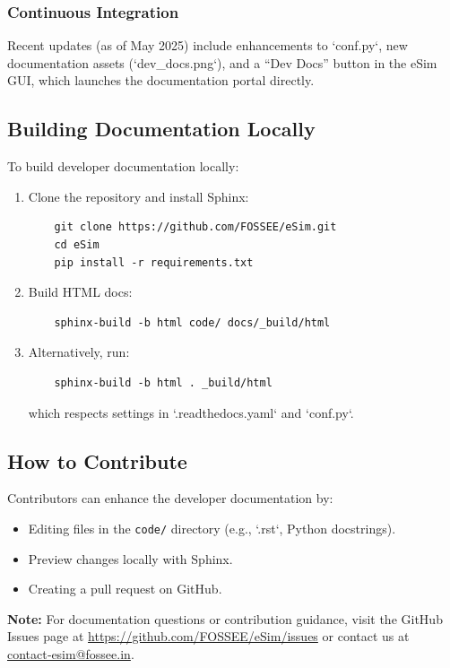 \subsubsection*{Continuous Integration}
Recent updates (as of May 2025) include enhancements to `conf.py`, new documentation assets (`dev\_docs.png`), and a “Dev Docs” button in the eSim GUI, which launches the documentation portal directly. 

\subsection{Building Documentation Locally}
To build developer documentation locally:
\begin{enumerate}
  \item Clone the repository and install Sphinx:
    \begin{verbatim}
    git clone https://github.com/FOSSEE/eSim.git
    cd eSim
    pip install -r requirements.txt
    \end{verbatim}
  \item Build HTML docs:
    \begin{verbatim}
    sphinx-build -b html code/ docs/_build/html
    \end{verbatim}
  \item Alternatively, run:
    \begin{verbatim}
    sphinx-build -b html . _build/html
    \end{verbatim}
    which respects settings in `.readthedocs.yaml` and `conf.py`.

\end{enumerate}

\subsection{How to Contribute}
Contributors can enhance the developer documentation by:
\begin{itemize}
  \item Editing files in the \texttt{code/} directory (e.g., `.rst`, Python docstrings).
  \item Preview changes locally with Sphinx.
  \item Creating a pull request on GitHub.
\end{itemize}

\begin{center}
  {\color{red}\LARGE\textbf{Note:} For documentation questions or contribution guidance, visit the GitHub Issues page at \url{https://github.com/FOSSEE/eSim/issues} or contact us at \href{mailto:contact-esim@fossee.in}{contact‑esim@fossee.in}.}
\end{center}
